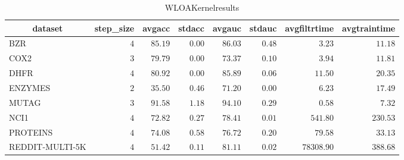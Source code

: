 \begin{table}[!tbp]
\caption{WLOAKernelresults\label{WLOAKernelresults}} 
{\centering
\begin{tabular}{lrrrrrrr}
\hline\hline
\multicolumn{1}{c}{dataset}&\multicolumn{1}{c}{step_size}&\multicolumn{1}{c}{avgacc}&\multicolumn{1}{c}{stdacc}&\multicolumn{1}{c}{avgauc}&\multicolumn{1}{c}{stdauc}&\multicolumn{1}{c}{avgfiltrtime}&\multicolumn{1}{c}{avgtraintime}\tabularnewline
\hline
BZR&$4$&$85.19$&$0.00$&$86.03$&$0.48$&$    3.23$&$ 11.18$\tabularnewline
COX2&$3$&$79.79$&$0.00$&$73.37$&$0.10$&$    3.94$&$ 11.81$\tabularnewline
DHFR&$4$&$80.92$&$0.00$&$85.89$&$0.06$&$   11.50$&$ 20.35$\tabularnewline
ENZYMES&$2$&$35.50$&$0.46$&$71.20$&$0.00$&$    6.23$&$ 17.49$\tabularnewline
MUTAG&$3$&$91.58$&$1.18$&$94.10$&$0.29$&$    0.58$&$  7.32$\tabularnewline
NCI1&$4$&$72.82$&$0.27$&$78.41$&$0.01$&$  541.80$&$230.53$\tabularnewline
PROTEINS&$4$&$74.08$&$0.58$&$76.72$&$0.20$&$   79.58$&$ 33.13$\tabularnewline
REDDIT-MULTI-5K&$4$&$51.42$&$0.11$&$81.11$&$0.02$&$78308.90$&$388.68$\tabularnewline
\hline
\end{tabular}}
\end{table}
